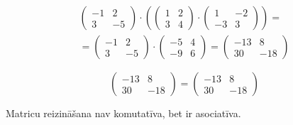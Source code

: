 \documentclass{article}
\begin{document}
\begin{gather*}
    \begin{pmatrix}
        -1 & 2\\
        3 & -5
    \end{pmatrix}
    \cdot
    \left(
        \begin{pmatrix}
            1 & 2\\
            3 & 4
        \end{pmatrix}
        \cdot
        \begin{pmatrix}
            1 & -2\\
            -3 & 3
        \end{pmatrix}
    \right)
    =
    \\
    =
    \begin{pmatrix}
        -1 & 2\\
        3 & -5
    \end{pmatrix}
    \cdot
    \begin{pmatrix}
        -5 & 4\\
        -9 & 6
    \end{pmatrix}
    =
    \begin{pmatrix}
        -13 & 8\\
        30 & -18
    \end{pmatrix}
\end{gather*}

\begin{equation*}
    \begin{pmatrix}
        -13 & 8\\
        30 & -18
    \end{pmatrix}
    =
    \begin{pmatrix}
        -13 & 8\\
        30 & -18
    \end{pmatrix}
\end{equation*}

Matricu reizināšana nav komutatīva, bet ir asociatīva.
\end{document}
